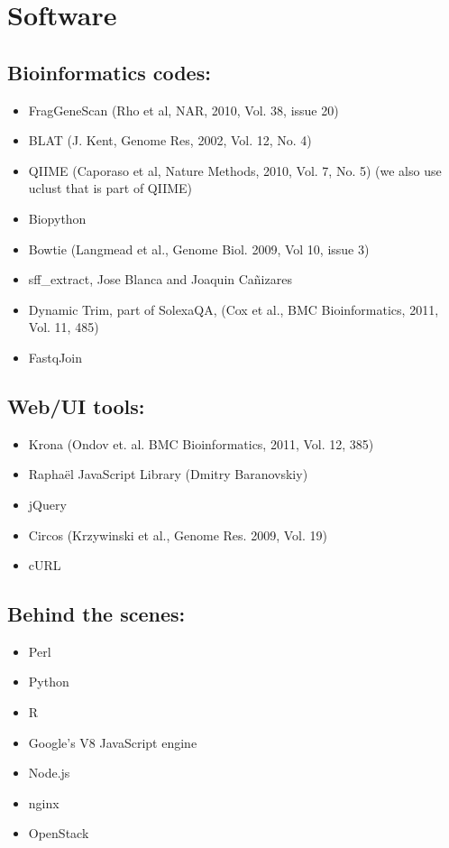 \documentclass[12pt,fullpage]{report}
\begin{document}
\section{Software}

\subsection{Bioinformatics codes:}
\begin{itemize}
\item      FragGeneScan \cite{FGS} (Rho et al, NAR, 2010, Vol. 38, issue 20)
 \item     BLAT \cite{BLAT} (J. Kent, Genome Res, 2002, Vol. 12, No. 4)
 \item     QIIME \cite{QIIME} (Caporaso et al, Nature Methods, 2010, Vol. 7, No. 5) (we also use uclust that is part of QIIME)
 \item     Biopython
 \item     Bowtie \cite{BOWTIE} (Langmead et al., Genome Biol. 2009, Vol 10, issue 3)
 \item     sff\_extract, Jose Blanca and Joaquin Cañizares
\item      Dynamic Trim, part of SolexaQA, \cite{SOLEXAQA} (Cox et al., BMC Bioinformatics, 2011, Vol. 11, 485)
 \item     FastqJoin
\end{itemize}
\subsection{Web/UI tools:}
\begin{itemize}
  \item    Krona \cite{KRONA} (Ondov et. al. BMC Bioinformatics, 2011, Vol. 12, 385)
  \item    Raphaël JavaScript Library (Dmitry Baranovskiy)
 \item     jQuery
  \item    Circos (Krzywinski et al., Genome Res. 2009, Vol. 19)
  \item    cURL
\end{itemize}
\subsection{Behind the scenes:}
\begin{itemize}
  \item    Perl
  \item    Python
  \item    R
  \item    Google’s V8  JavaScript engine
\item      Node.js
 \item     nginx
 \item     OpenStack
\end{itemize}
\end{document}

